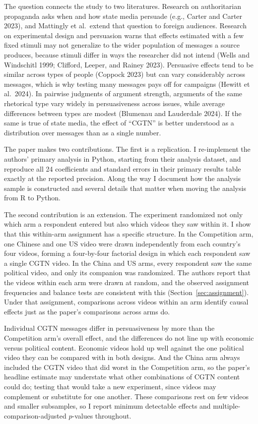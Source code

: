 \documentclass[11pt]{article}
\begin{document}
The question connects the study to two literatures. Research on authoritarian propaganda asks when and how state media persuade (e.g., Carter and Carter 2023), and Mattingly et al.\ extend that question to foreign audiences. Research on experimental design and persuasion warns that effects estimated with a few fixed stimuli may not generalize to the wider population of messages a source produces, because stimuli differ in ways the researcher did not intend (Wells and Windschitl 1999; Clifford, Leeper, and Rainey 2023). Persuasive effects tend to be similar across types of people (Coppock 2023) but can vary considerably across messages, which is why testing many messages pays off for campaigns (Hewitt et al.\ 2024). In pairwise judgments of argument strength, arguments of the same rhetorical type vary widely in persuasiveness across issues, while average differences between types are modest (Blumenau and Lauderdale 2024). If the same is true of state media, the effect of ``CGTN'' is better understood as a distribution over messages than as a single number.

The paper makes two contributions. The first is a replication. I re-implement the authors' primary analysis in Python, starting from their analysis dataset, and reproduce all 24 coefficients and standard errors in their primary results table exactly at the reported precision. Along the way I document how the analysis sample is constructed and several details that matter when moving the analysis from R to Python.

The second contribution is an extension. The experiment randomized not only which arm a respondent entered but also which videos they saw within it. I show that this within-arm assignment has a specific structure. In the Competition arm, one Chinese and one US video were drawn independently from each country's four videos, forming a four-by-four factorial design in which each respondent saw a single CGTN video. In the China and US arms, every respondent saw the same political video, and only its companion was randomized. The authors report that the videos within each arm were drawn at random, and the observed assignment frequencies and balance tests are consistent with this (Section~\ref{sec:assignment}). Under that assignment, comparisons across videos within an arm identify causal effects just as the paper's comparisons across arms do.

Individual CGTN messages differ in persuasiveness by more than the Competition arm's overall effect, and the differences do not line up with economic versus political content. Economic videos hold up well against the one political video they can be compared with in both designs. And the China arm always included the CGTN video that did worst in the Competition arm, so the paper's headline estimate may understate what other combinations of CGTN content could do; testing that would take a new experiment, since videos may complement or substitute for one another. These comparisons rest on few videos and smaller subsamples, so I report minimum detectable effects and multiple-comparison-adjusted $p$-values throughout.
\end{document}
